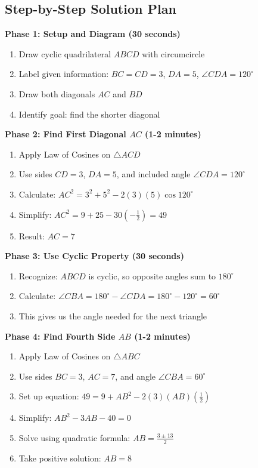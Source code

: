 \documentclass[11pt]{article}
\begin{document}
\begin{solutionbox}
\subsection*{Step-by-Step Solution Plan}

\textbf{Phase 1: Setup and Diagram (30 seconds)}
\begin{enumerate}
    \item Draw cyclic quadrilateral $ABCD$ with circumcircle
    \item Label given information: $BC = CD = 3$, $DA = 5$, $\angle CDA = 120^\circ$
    \item Draw both diagonals $AC$ and $BD$
    \item Identify goal: find the shorter diagonal
\end{enumerate}

\textbf{Phase 2: Find First Diagonal $AC$ (1-2 minutes)}
\begin{enumerate}[resume]
    \item Apply Law of Cosines on $\triangle ACD$
    \item Use sides $CD = 3$, $DA = 5$, and included angle $\angle CDA = 120^\circ$
    \item Calculate: $AC^2 = 3^2 + 5^2 - 2(3)(5)\cos 120^\circ$
    \item Simplify: $AC^2 = 9 + 25 - 30(-\frac{1}{2}) = 49$
    \item Result: $AC = 7$
\end{enumerate}

\textbf{Phase 3: Use Cyclic Property (30 seconds)}
\begin{enumerate}[resume]
    \item Recognize: $ABCD$ is cyclic, so opposite angles sum to $180^\circ$
    \item Calculate: $\angle CBA = 180^\circ - \angle CDA = 180^\circ - 120^\circ = 60^\circ$
    \item This gives us the angle needed for the next triangle
\end{enumerate}

\textbf{Phase 4: Find Fourth Side $AB$ (1-2 minutes)}
\begin{enumerate}[resume]
    \item Apply Law of Cosines on $\triangle ABC$
    \item Use sides $BC = 3$, $AC = 7$, and angle $\angle CBA = 60^\circ$
    \item Set up equation: $49 = 9 + AB^2 - 2(3)(AB)(\frac{1}{2})$
    \item Simplify: $AB^2 - 3AB - 40 = 0$
    \item Solve using quadratic formula: $AB = \frac{3 \pm 13}{2}$
    \item Take positive solution: $AB = 8$
\end{enumerate}


\end{solutionbox}
\end{document}
